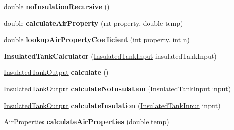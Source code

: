 \begin{DoxyCompactItemize}
\mbox{\label{class_insulated_tank_calculator_a5b470dbc6c206cce9c997be281997f20}} 
double {\bfseries no\+Insulation\+Recursive} ()
\item 
\mbox{\label{class_insulated_tank_calculator_a2f7dfc0f35c887849f778e7e342efe48}} 
double {\bfseries calculate\+Air\+Property} (int property, double temp)
\item 
\mbox{\label{class_insulated_tank_calculator_af91fb268ec43e8cb3ccdbce40f45b46c}} 
double {\bfseries lookup\+Air\+Property\+Coefficient} (int property, int n)
\item 
\mbox{\label{class_insulated_tank_calculator_a2179048bd97f926178964043c3249ae6}} 
{\bfseries Insulated\+Tank\+Calculator} (\hyperlink{class_insulated_tank_input}{Insulated\+Tank\+Input} insulated\+Tank\+Input)
\item 
\mbox{\label{class_insulated_tank_calculator_a028195292f18e48216475db52a0f4651}} 
\hyperlink{class_insulated_tank_output}{Insulated\+Tank\+Output} {\bfseries calculate} ()
\item 
\mbox{\label{class_insulated_tank_calculator_af1b61338df8facee94cdd2c88d160eee}} 
\hyperlink{class_insulated_tank_output}{Insulated\+Tank\+Output} {\bfseries calculate\+No\+Insulation} (\hyperlink{class_insulated_tank_input}{Insulated\+Tank\+Input} input)
\item 
\mbox{\label{class_insulated_tank_calculator_a9dede09f397b135d15451c06e20596a9}} 
\hyperlink{class_insulated_tank_output}{Insulated\+Tank\+Output} {\bfseries calculate\+Insulation} (\hyperlink{class_insulated_tank_input}{Insulated\+Tank\+Input} input)
\item 
\mbox{\label{class_insulated_tank_calculator_af65eb305cc12e7e1c539e160f60837bd}} 
\hyperlink{class_air_properties}{Air\+Properties} {\bfseries calculate\+Air\+Properties} (double temp)
\item 
\mbox{\label{class_insulated_tank_calculator_aa924a8b8a7e0d17e33666e910b8d6d0b}} 

\end{DoxyCompactItemize}
